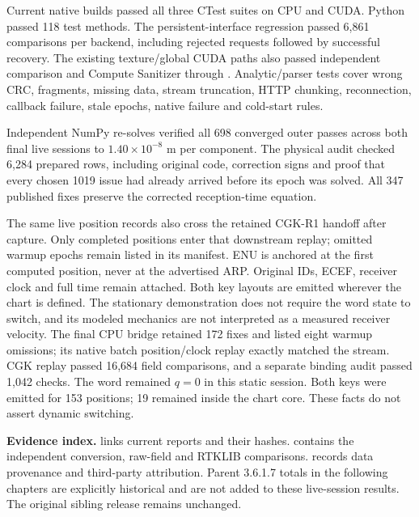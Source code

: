Current native builds passed all three CTest suites on CPU and CUDA. Python passed
118 test methods. The persistent-interface regression passed 6,861 comparisons
per backend, including rejected requests followed by successful recovery.
The existing texture/global CUDA paths also passed independent comparison and
Compute Sanitizer through . Analytic/parser tests
cover wrong CRC, fragments, missing data, stream truncation, HTTP chunking,
reconnection, callback failure, stale epochs, native failure and cold-start rules.

Independent NumPy re-solves verified all 698 converged outer passes across both
final live sessions to $1.40\times10^{-8}$ m per component. The physical audit
checked 6,284 prepared rows, including original code, correction signs and proof
that every chosen 1019 issue had already arrived before its epoch was solved.
All 347 published fixes preserve the corrected reception-time equation.

The same live position records also cross the retained CGK-R1 handoff after
capture. Only completed positions enter that downstream replay; omitted warmup
epochs remain listed in its manifest. ENU is anchored at the first computed
position, never at the advertised ARP. Original IDs, ECEF, receiver clock and full
time remain attached. Both key layouts are emitted wherever the chart is defined.
The stationary demonstration does not require the word state to switch, and its
modeled mechanics are not interpreted as a measured receiver velocity. The final
CPU bridge retained 172 fixes and listed eight warmup omissions; its native batch
position/clock replay exactly matched the stream. CGK replay passed 16,684 field
comparisons, and a separate binding audit passed 1,042 checks. The word remained
$q=0$ in this static session. Both keys were emitted for 153 positions; 19
remained inside the chart core. These facts do not assert dynamic switching.

\textbf{Evidence index.}  links current
reports and their hashes.  contains the independent
conversion, raw-field and RTKLIB comparisons. 
records data provenance and third-party attribution. Parent 3.6.1.7 totals in
the following chapters are explicitly historical and are not added to these
live-session results. The original sibling release remains unchanged.
